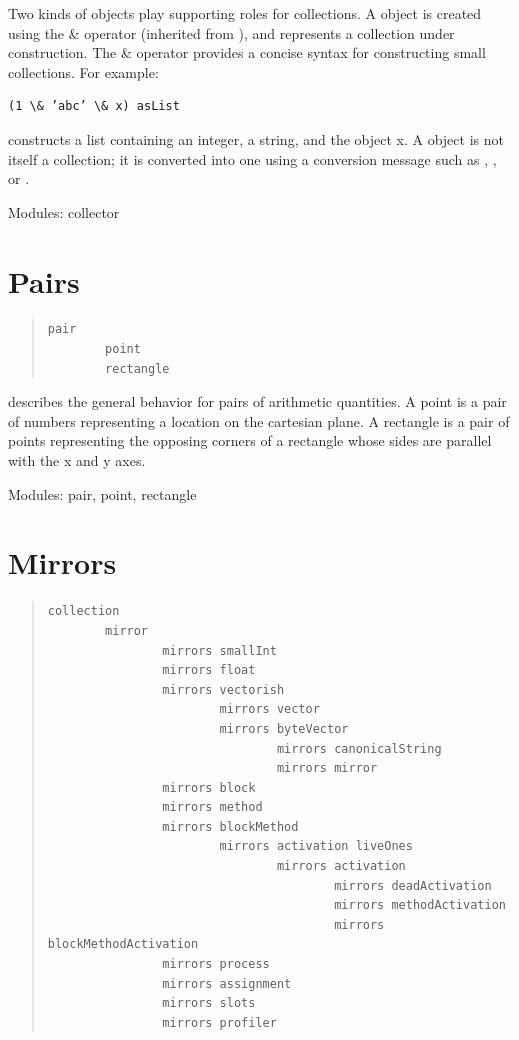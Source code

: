 \documentclass[letterpaper,10pt,english]{sphinxmanual}
\begin{document}
Two kinds of objects play supporting roles for collections. A  object is created using
the \& operator (inherited from ), and represents a collection under construction.
The \& operator provides a concise syntax for constructing small collections. For example:

\begin{Verbatim}[commandchars=\\\{\}]
(1 \& ’abc’ \& x) asList
\end{Verbatim}

constructs a list containing an integer, a string, and the object x. A  object is not itself
a collection; it is converted into one using a conversion message such as , , or
.

Modules: collector


\section{Pairs}
\label{pairs:pairs}\label{pairs::doc}\begin{quote}

\begin{Verbatim}[commandchars=\\\{\}]
pair
        point
        rectangle
\end{Verbatim}
\end{quote}

 describes the general behavior for pairs of arithmetic quantities. A point is a pair of
numbers representing a location on the cartesian plane. A rectangle is a pair of points representing
the opposing corners of a rectangle whose sides are parallel with the x and y axes.

Modules: pair, point, rectangle


\section{Mirrors}
\label{mirrors::doc}\label{mirrors:mirrors}\begin{quote}

\begin{Verbatim}[commandchars=\\\{\}]
collection
        mirror
                mirrors smallInt
                mirrors float
                mirrors vectorish
                        mirrors vector
                        mirrors byteVector
                                mirrors canonicalString
                                mirrors mirror
                mirrors block
                mirrors method
                mirrors blockMethod
                        mirrors activation liveOnes
                                mirrors activation
                                        mirrors deadActivation
                                        mirrors methodActivation
                                        mirrors blockMethodActivation
                mirrors process
                mirrors assignment
                mirrors slots
                mirrors profiler
\end{Verbatim}
\end{quote}
\end{document}
